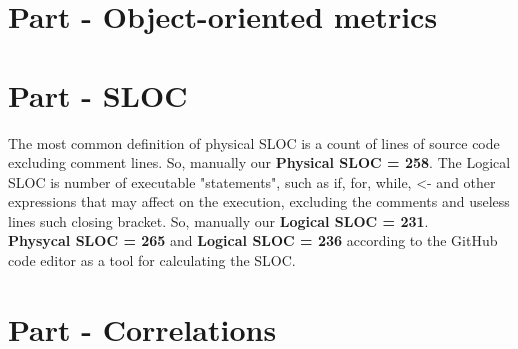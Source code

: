 \documentclass[12pt]{article}
\begin{document}
\section{Part - Object-oriented metrics}

\section{Part - SLOC}
The most common definition of physical SLOC is a count of lines of source code excluding comment lines.
So, manually our \textbf{Physical SLOC = 258}. The Logical SLOC is number of executable "statements", such as if, for, while, <- and other expressions that may affect on the execution, excluding the comments and useless lines such closing bracket. So, manually our \textbf{Logical SLOC = 231}.\\

\textbf{Physycal SLOC = 265} and \textbf{Logical SLOC = 236} according to the GitHub code editor as a tool for calculating the SLOC.
\section{{Part - Correlations}}

{}

\end{document}
